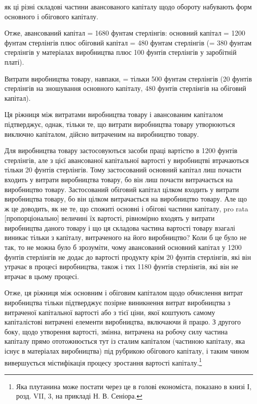 \parcont{}  %
як ці різні складові частини авансованого капіталу щодо обороту
набувають форм основного і обігового капіталу.

Отже, авансований капітал = 1680 фунтам стерлінгів: основний
капітал = 1200 фунтам стерлінгів плюс обіговий капітал =
480 фунтам стерлінгів (= 380 фунтам стерлінгів у матеріалах
виробництва плюс 100 фунтів стерлінгів у заробітній платі).

Витрати виробництва товару, навпаки, = тільки 500 фунтам
стерлінгів (20 фунтів стерлінгів на зношування основного капіталу,
480 фунтів стерлінгів на обіговий капітал).

Ця ріжниця між витратами виробництва товару і авансованим
капіталом підтверджує, однак, тільки те, що витрати
виробництва товару утворюються виключно капіталом, дійсно
витраченим на виробництво товару.

Для виробництва товару застосовуються засоби праці вартістю
в 1200 фунтів стерлінгів, але з цієї авансованої капітальної
вартості у виробництві втрачаються тільки 20 фунтів
стерлінгів. Тому застосований основний капітал лиш почасти
входить у витрати виробництва товару, бо він лиш почасти
витрачається на виробництво товару. Застосований обіговий
капітал цілком входить у витрати виробництва товару, бо він
цілком витрачається на виробництво товару. Але що ж це доводить,
як не те, що спожиті основні і обігові частини капіталу,
pro rata [пропорціонально] величині їх вартості, рівномірно
входять у витрати виробництва даного товару і що ця складова
частина вартості товару взагалі виникає тільки з капіталу,
витраченого на його виробництво? Коли б це було не так, то
не можна було б зрозуміти, чому авансований основний капітал
у 1200 фунтів стерлінгів не додає до вартості продукту крім
20 фунтів стерлінгів, які він утрачає в процесі виробництва,
також і тих 1180 фунтів стерлінгів, які він не втрачає в цьому
процесі.

Отже, ця ріжниця між основним і обіговим капіталом щодо
обчислення витрат виробництва тільки підтверджує позірне
виникнення витрат виробництва з витраченої капітальної вартості
або з тієї ціни, якої коштують самому капіталістові витрачені
елементи виробництва, включаючи й працю. З другого
боку, щодо утворення вартості, змінна, витрачена на робочу
силу частина капіталу прямо ототожнюється тут із сталим капіталом
(частиною капіталу, яка існує в матеріалах виробництва)
під рубрикою обігового капіталу, і таким чином вивершується
містифікація процесу зростання вартості капіталу.\footnote{
Яка плутанина може постати через це в голові економіста, показано
в книзі І, розд. VII, 3, на прикладі Н. В. Сеніора.
}

